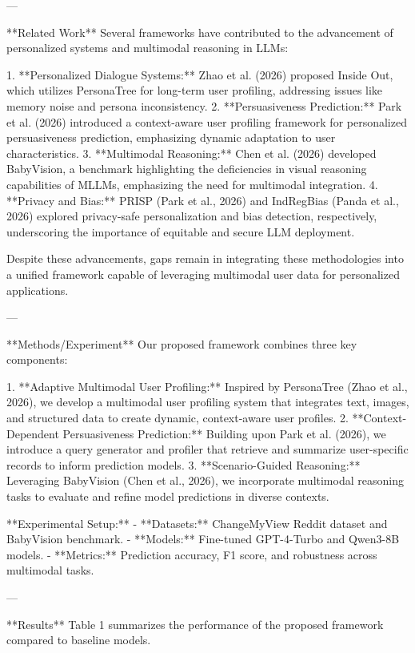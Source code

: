 ---

**Related Work**  
Several frameworks have contributed to the advancement of personalized systems and multimodal reasoning in LLMs:  

1. **Personalized Dialogue Systems:** Zhao et al. (2026) proposed Inside Out, which utilizes PersonaTree for long-term user profiling, addressing issues like memory noise and persona inconsistency.  
2. **Persuasiveness Prediction:** Park et al. (2026) introduced a context-aware user profiling framework for personalized persuasiveness prediction, emphasizing dynamic adaptation to user characteristics.  
3. **Multimodal Reasoning:** Chen et al. (2026) developed BabyVision, a benchmark highlighting the deficiencies in visual reasoning capabilities of MLLMs, emphasizing the need for multimodal integration.  
4. **Privacy and Bias:** PRISP (Park et al., 2026) and IndRegBias (Panda et al., 2026) explored privacy-safe personalization and bias detection, respectively, underscoring the importance of equitable and secure LLM deployment.

Despite these advancements, gaps remain in integrating these methodologies into a unified framework capable of leveraging multimodal user data for personalized applications.

---

**Methods/Experiment**  
Our proposed framework combines three key components:  

1. **Adaptive Multimodal User Profiling:** Inspired by PersonaTree (Zhao et al., 2026), we develop a multimodal user profiling system that integrates text, images, and structured data to create dynamic, context-aware user profiles.  
2. **Context-Dependent Persuasiveness Prediction:** Building upon Park et al. (2026), we introduce a query generator and profiler that retrieve and summarize user-specific records to inform prediction models.  
3. **Scenario-Guided Reasoning:** Leveraging BabyVision (Chen et al., 2026), we incorporate multimodal reasoning tasks to evaluate and refine model predictions in diverse contexts.

**Experimental Setup:**  
- **Datasets:** ChangeMyView Reddit dataset and BabyVision benchmark.  
- **Models:** Fine-tuned GPT-4-Turbo and Qwen3-8B models.  
- **Metrics:** Prediction accuracy, F1 score, and robustness across multimodal tasks.  

---

**Results**  
Table 1 summarizes the performance of the proposed framework compared to baseline models.  

